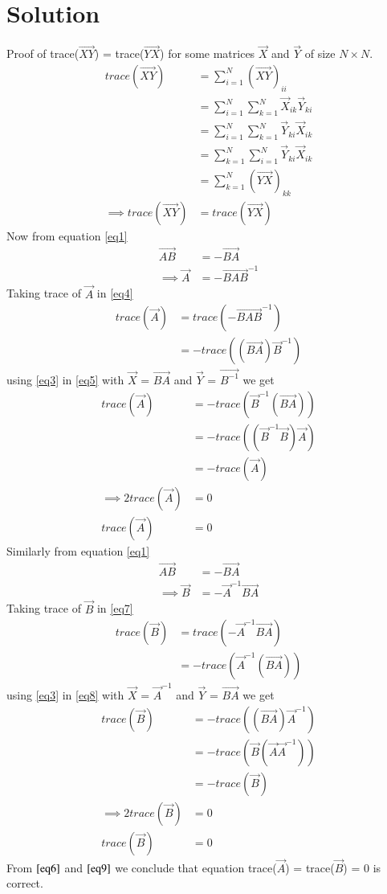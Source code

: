 \documentclass[journal,12pt,twocolumn]{IEEEtran}
\begin{document}
\section{\textbf{Solution}}
Proof of trace($\vec{XY}$) = trace($\vec{YX}$) for some matrices $\vec{X}$ and $\vec{Y}$ of size $N \times N$.
\begin{align}
    trace(\vec{XY}) &= \sum_{i=1}^{N}(\vec{XY})_{ii}\\
    &= \sum_{i=1}^{N}\sum_{k=1}^{N}\vec{X}_{ik}\vec{Y}_{ki}\\
    &= \sum_{i=1}^{N}\sum_{k=1}^{N}\vec{Y}_{ki}\vec{X}_{ik}\\
    &= \sum_{k=1}^{N}\sum_{i=1}^{N}\vec{Y}_{ki}\vec{X}_{ik}\\
    &= \sum_{k=1}^{N}(\vec{YX})_{kk}\\
    \implies trace(\vec{XY})&=trace(\vec{YX})\label{eq3}
\end{align}
Now from equation \eqref{eq1}
\begin{align}
    \vec{AB} &= -\vec{BA}\\
    \implies \vec{A} &= -\vec{BAB}^{-1}\label{eq4}
\end{align}
Taking trace of $\vec{A}$ in \eqref{eq4}
\begin{align}
    trace(\vec{A}) &= trace(-\vec{BAB}^{-1})\\
    &= -trace((\vec{BA})\vec{B}^{-1})\label{eq5}
\end{align}
using \eqref{eq3} in \eqref{eq5} with $\vec{X}$ = $\vec{BA}$ and $\vec{Y}$ = $\vec{B^{-1}}$ we get
\begin{align}
    trace(\vec{A}) &= -trace(\vec{B}^{-1}(\vec{BA}))\\
    &= -trace((\vec{B}^{-1}\vec{B})\vec{A})\\
    &= -trace(\vec{A})\\
    \implies2trace(\vec{A}) &= 0\\
    trace(\vec{A}) &= 0\label{eq6}
\end{align}
Similarly from equation \eqref{eq1}
\begin{align}
    \vec{AB} &= -\vec{BA}\\
    \implies \vec{B} &= -\vec{A}^{-1}\vec{BA}\label{eq7}
\end{align}
Taking trace of $\vec{B}$ in \eqref{eq7}
\begin{align}
    trace(\vec{B}) &= trace(-\vec{A}^{-1}\vec{BA})\\
    &= -trace(\vec{A}^{-1}(\vec{BA}))\label{eq8}
\end{align}
using \eqref{eq3} in \eqref{eq8} with $\vec{X}$ = $\vec{A}^{-1}$ and $\vec{Y}$ = $\vec{BA}$ we get
\begin{align}
    trace(\vec{B}) &= -trace((\vec{BA})\vec{A}^{-1})\\
    &= -trace(\vec{B}(\vec{A}\vec{A}^{-1}))\\
    &= -trace(\vec{B})\\
    \implies2trace(\vec{B}) &= 0\\
    trace(\vec{B}) &= 0\label{eq9}
\end{align}
From $\eqref{eq6}$ and $\eqref{eq9}$ we conclude that equation trace($\vec{A}$) = trace($\vec{B}$) = 0 is correct.
\end{document}
